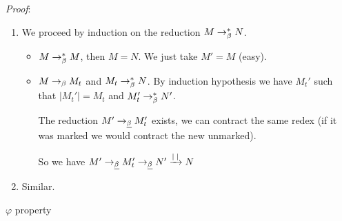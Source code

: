   \textit{Proof}:
    \begin{enumerate}
      \item We proceed by induction on the reduction $M \to_\beta^* N$. 
        \begin{itemize}
          \item $M \to_\beta^* M$, then $M = N$. We just take $M' = M$ (easy).
          \item $M \to_\beta M_t$ and $M_t \to_\beta^* N$. By induction hypothesis we
            have $M_t'$ such that $|M_t'| = M_t $ and $M_t' \to_\beta^* N'$.

            The reduction $M' \to_{\underline \beta} M'_t$ exists, we can contract the same
            redex (if it was marked we would contract the new unmarked).

            So we have $M' \to_{\underline \beta} M'_t \to_{\underline \beta} N' \xrightarrow{|\;|} N$
        \end{itemize}
      \item Similar.
    \end{enumerate}
  \qedsymbol

  \lemma $\varphi$ property
    \label{lemm:phi}

